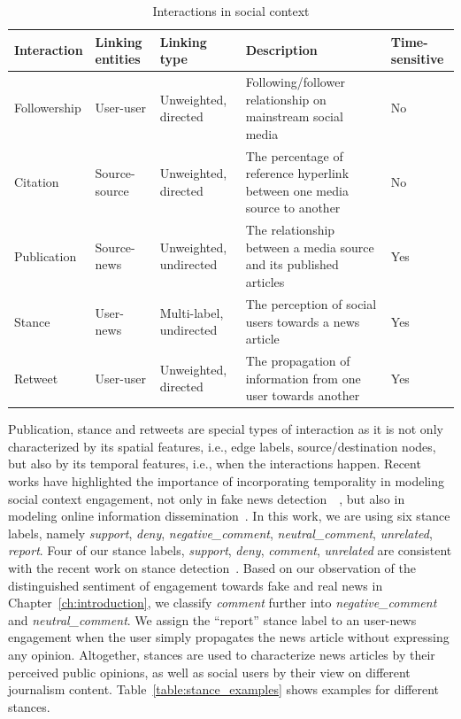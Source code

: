 \documentclass[fyp]{socreport}
\theoremstyle{definition}
\theoremstyle{hypothesis}
\begin{document}
\begin{table}[t]
  \centering
  \tiny
  \begin{tabular}{|p{1.5cm}|p{2cm}|p{2.5cm}|p{5cm}|p{1cm}|}
    \hline
    Interaction & Linking entities & Linking type & Description & Time-sensitive \\ \hline \hline
    Followership & User-user & Unweighted, directed & Following/follower relationship on mainstream social media & No \\ \hline
    Citation & Source-source & Unweighted, directed & The percentage of reference hyperlink between one media source to another & No \\ \hline
    Publication & Source-news & Unweighted, undirected & The relationship between a media source and its published articles & Yes \\ \hline
    Stance & User-news & Multi-label, undirected & The perception of social users towards a news article & Yes \\ \hline
    Retweet & User-user & Unweighted, directed & The propagation of information from one user towards another & Yes \\ \hline 
  \end{tabular}
  \caption{Interactions in social context}
  \label{table:social_interactions}
\end{table}

Publication, stance and retweets are special types of interaction as it is not only characterized by its spatial features, i.e., edge labels, source/destination nodes, but also by its temporal features, i.e., when the interactions happen. Recent works have highlighted the importance of incorporating temporality in modeling social context engagement, not only in fake news detection~\cite{ruchansky2017csi}~\cite{ma2015detect}, but also in modeling online information dissemination~\cite{he2014predicting}. In this work, we are using six  stance labels, namely \textit{support}, \textit{deny}, \textit{negative\_comment}, \textit{neutral\_comment}, \textit{unrelated}, \textit{report}. Four of our stance labels, \textit{support}, \textit{deny}, \textit{comment}, \textit{unrelated} are consistent with the recent work on stance detection~\cite{mohtarami2018automatic}. Based on our observation of the distinguished sentiment of engagement towards fake and real news in Chapter~\ref{ch:introduction}, we classify \textit{comment} further into \textit{negative\_comment} and \textit{neutral\_comment}. We assign the ``report'' stance label to an user-news engagement when the user simply propagates the news article without expressing any opinion. Altogether, stances are used to characterize news articles by their perceived public opinions, as well as social users by their view on different journalism content. Table~\ref{table:stance_examples} shows examples for different stances.
\end{document}
